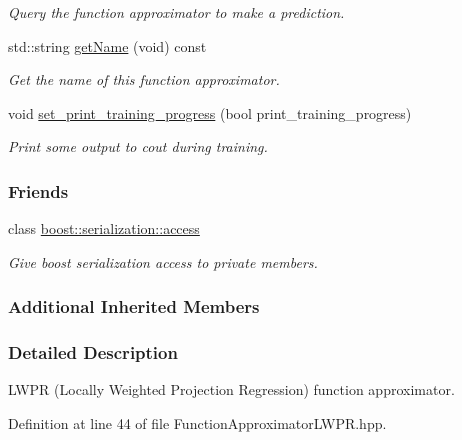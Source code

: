 \begin{DoxyCompactItemize}
\begin{DoxyCompactList}\small\item\em Query the function approximator to make a prediction. \end{DoxyCompactList}\item 
std\+::string \hyperlink{classDmpBbo_1_1FunctionApproximatorLWPR_ad4c95407e44ba3e16b9651f9b81cd0e6}{get\+Name} (void) const 
\begin{DoxyCompactList}\small\item\em Get the name of this function approximator. \end{DoxyCompactList}\item 
void \hyperlink{classDmpBbo_1_1FunctionApproximatorLWPR_a50124b32a40e1246d8d241be4f668563}{set\+\_\+print\+\_\+training\+\_\+progress} (bool print\+\_\+training\+\_\+progress)
\begin{DoxyCompactList}\small\item\em Print some output to cout during training. \end{DoxyCompactList}\end{DoxyCompactItemize}
\subsubsection*{Friends}
\begin{DoxyCompactItemize}
\item 
class \hyperlink{classDmpBbo_1_1FunctionApproximatorLWPR_ac98d07dd8f7b70e16ccb9a01abf56b9c}{boost\+::serialization\+::access}
\begin{DoxyCompactList}\small\item\em Give boost serialization access to private members. \end{DoxyCompactList}\end{DoxyCompactItemize}
\subsubsection*{Additional Inherited Members}


\subsubsection{Detailed Description}
L\+W\+P\+R (Locally Weighted Projection Regression) function approximator. 

Definition at line 44 of file Function\+Approximator\+L\+W\+P\+R.\+hpp.



